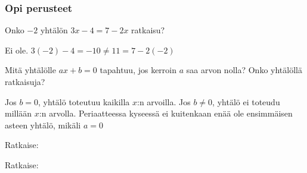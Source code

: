 \begin{tehtavasivu}


\subsubsection*{Opi perusteet}

\begin{tehtava}
Onko $-2$ yhtälön $3x-4 = 7-2x$ ratkaisu?
\begin{vastaus}
Ei ole. $3(-2)-4 = -10 \ne 11=7-2(-2)$
\end{vastaus}
\end{tehtava}

\begin{tehtava}
Mitä yhtälölle $ax+b = 0$ tapahtuu, jos kerroin $a$ saa arvon nolla?
Onko yhtälöllä ratkaisuja?
\begin{vastaus}
Jos $b = 0$, yhtälö toteutuu kaikilla $x$:n arvoilla. Jos $b \neq 0$, yhtälö
ei toteudu millään $x$:n arvolla. Periaatteessa kyseessä ei kuitenkaan
enää ole ensimmäisen asteen yhtälö, mikäli $a = 0$
\end{vastaus}
\end{tehtava}

\begin{tehtava}
%
Ratkaise:
\begin{alakohdat}
\end{alakohdat}
\begin{vastaus}
\begin{alakohdat}
\end{alakohdat}
\end{vastaus}
\end{tehtava}


\begin{tehtava}
Ratkaise:
\begin{alakohdat}
\end{alakohdat}
\begin{vastaus}
\begin{alakohdat}
\end{alakohdat}
\end{vastaus}
\end{tehtava}


\end{tehtavasivu}
